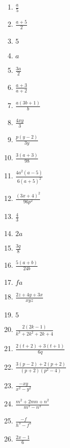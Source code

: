 \begin{multicols}{2}
\begin{enumerate}[itemsep=5pt, label=\textbf{\arabic*}. ] 
\item $\frac{a}{5}$%
\item $\frac{a + 5}{2}$%
\item $5$%
\item $a$%
\item $\frac{3a}{2}$%
\item $\frac{a + 3}{a + 2}$%
\item $\frac{a(3b + 1)}{b}$%
\item $\frac{4xy}{3}$%
\item $\frac{p(y - 2)}{3y}$%
\item $\frac{3(a + 3)}{98}$%
\item $\frac{4a^2(a - 5)}{6(a + 5)^2}$%
\item $\frac{(3x + 4)^2}{96p^2}$%
\item $\frac{4}{3}$%
\item $2a$%
\item $\frac{3q}{8}$%
\item $\frac{5(a + b)}{24b}$%
\item $fa$%
\item $\frac{2z + 4y + 3x}{xyz}$%
\item $5$%
\item $\frac{2(2k - 1)}{k^3 + 2k^2 + 2k + 4}$%
\item $\frac{2(t + 2) + 3(t + 1)}{6q}$%
\item $\frac{3(p - 2) + 2(p + 2)}{(p + 2)(p^2 - 4)}$%
\item $\frac{-xy}{x^2 - y^2}$%
\item $\frac{m^2 + 2mn + n^2}{m^3 - n^3}$%
\item $\frac{-f}{h^3 - f^3}$%
\item $\frac{2x - 1}{6}$%
\end{enumerate}
\end{multicols}

